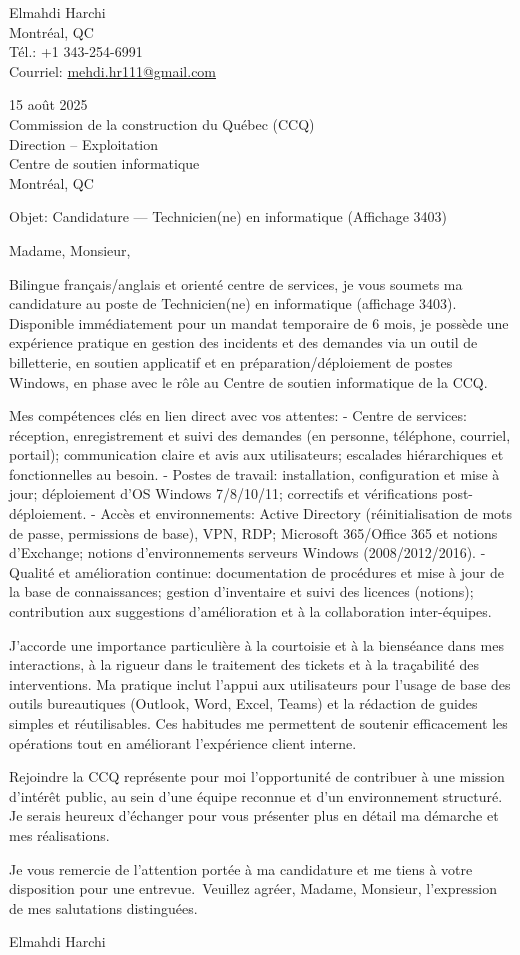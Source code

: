 \documentclass[letterpaper,11pt]{article}
\begin{document}
Elmahdi Harchi\\
Montréal, QC\\
Tél.: +1 343-254-6991\\
Courriel: \href{mailto:mehdi.hr111@gmail.com}{mehdi.hr111@gmail.com}

15 août 2025\\

Commission de la construction du Québec (CCQ)\\
Direction – Exploitation\\
Centre de soutien informatique\\
Montréal, QC

Objet: Candidature — Technicien(ne) en informatique (Affichage 3403)

Madame, Monsieur,

Bilingue français/anglais et orienté centre de services, je vous soumets ma candidature au poste de Technicien(ne) en informatique (affichage 3403). Disponible immédiatement pour un mandat temporaire de 6 mois, je possède une expérience pratique en gestion des incidents et des demandes via un outil de billetterie, en soutien applicatif et en préparation/déploiement de postes Windows, en phase avec le rôle au Centre de soutien informatique de la CCQ.

Mes compétences clés en lien direct avec vos attentes:
- Centre de services: réception, enregistrement et suivi des demandes (en personne, téléphone, courriel, portail); communication claire et avis aux utilisateurs; escalades hiérarchiques et fonctionnelles au besoin.
- Postes de travail: installation, configuration et mise à jour; déploiement d'OS Windows 7/8/10/11; correctifs et vérifications post-déploiement.
- Accès et environnements: Active Directory (réinitialisation de mots de passe, permissions de base), VPN, RDP; Microsoft 365/Office 365 et notions d'Exchange; notions d'environnements serveurs Windows (2008/2012/2016).
- Qualité et amélioration continue: documentation de procédures et mise à jour de la base de connaissances; gestion d'inventaire et suivi des licences (notions); contribution aux suggestions d'amélioration et à la collaboration inter-équipes.

J'accorde une importance particulière à la courtoisie et à la bienséance dans mes interactions, à la rigueur dans le traitement des tickets et à la traçabilité des interventions. Ma pratique inclut l'appui aux utilisateurs pour l'usage de base des outils bureautiques (Outlook, Word, Excel, Teams) et la rédaction de guides simples et réutilisables. Ces habitudes me permettent de soutenir efficacement les opérations tout en améliorant l'expérience client interne.

Rejoindre la CCQ représente pour moi l'opportunité de contribuer à une mission d'intérêt public, au sein d'une équipe reconnue et d'un environnement structuré. Je serais heureux d'échanger pour vous présenter plus en détail ma démarche et mes réalisations.

Je vous remercie de l'attention portée à ma candidature et me tiens à votre disposition pour une entrevue.\
Veuillez agréer, Madame, Monsieur, l'expression de mes salutations distinguées.

\vspace{10mm}
Elmahdi Harchi
\end{document}
